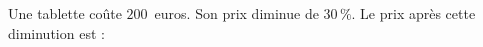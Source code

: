 
Une tablette coûte $200$~euros. Son prix diminue de $30\,\%$. Le prix après cette diminution est :

\smallskip

